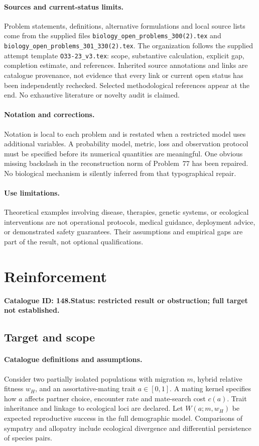 \documentclass[11pt]{article}
\begin{document}
\paragraph{Sources and current-status limits.}
Problem statements, definitions, alternative formulations and local source lists
come from the supplied files
\texttt{biology\_open\_problems\_300(2).tex} and
\texttt{biology\_open\_problems\_301\_330(2).tex}.
The organization follows the supplied attempt template
\texttt{O33-23\_v3.tex}: scope, substantive calculation, explicit gap,
completion estimate, and references. Inherited source annotations and links are
catalogue provenance, not evidence that every link or current open status has
been independently rechecked. Selected methodological references appear at the
end. No exhaustive literature or novelty audit is claimed.

\paragraph{Notation and corrections.}
Notation is local to each problem and is restated when a restricted model uses
additional variables. A probability model, metric, loss and observation protocol
must be specified before its numerical quantities are meaningful. One obvious
missing backslash in the reconstruction norm of Problem~77 has been repaired.
No biological mechanism is silently inferred from that typographical repair.

\paragraph{Use limitations.}
Theoretical examples involving disease, therapies, genetic systems, or ecological
interventions are not operational protocols, medical guidance, deployment advice,
or demonstrated safety guarantees. Their assumptions and empirical gaps are part
of the result, not optional qualifications.

\setcounter{section}{147}
\section{Reinforcement}
\label{prob:148}
\noindent\textbf{Catalogue ID: 148.}\quad \textbf{Status: restricted result or obstruction; full target not established.}
\subsection{Target and scope}
\paragraph{Catalogue definitions and assumptions.}
Consider two partially isolated populations with migration $m$, hybrid relative fitness $w_H$, and an assortative-mating trait $a\in[0,1]$. A mating kernel specifies how $a$ affects partner choice, encounter rate and mate-search cost $c(a)$. Trait inheritance and linkage to ecological loci are declared. Let $W(a;m,w_H)$ be expected reproductive success in the full demographic model. Comparisons of sympatry and allopatry include ecological divergence and differential persistence of species pairs.
\end{document}
